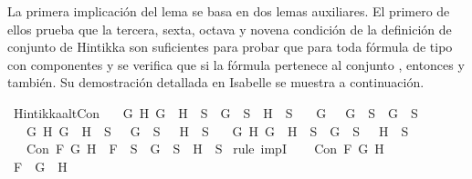 \begin{isabellebody}
\begin{isamarkuptext}
  La primera implicación del lema se basa en dos lemas auxiliares. El primero de ellos 
  prueba que la tercera, sexta, octava y novena condición de la definición de conjunto de 
  Hintikka son suficientes para probar que para toda fórmula de tipo \isa{{\isasymalpha}} con componentes 
   y  se verifica que si la fórmula pertenece al conjunto , entonces  y 
   también. Su demostración detallada en Isabelle se muestra a continuación.%
\end{isamarkuptext}\isamarkuptrue%
\isamarkupfalse%
\ Hintikka{\isacharunderscore}alt{}Con{\isacharcolon}\isanewline
\ \ \ {\isachardoublequoteopen}{\isacharparenleft}{\isasymforall}G\ H{\isachardot}\ G\ \isactrlbold {\isasymand}\ H\ {\isasymin}\ S\ {\isasymlongrightarrow}\ G\ {\isasymin}\ S\ {\isasymand}\ H\ {\isasymin}\ S{\isacharparenright}\isanewline
\ \ {\isasymand}\ {\isacharparenleft}{\isasymforall}G{\isachardot}\ \isactrlbold {\isasymnot}\ {\isacharparenleft}\isactrlbold {\isasymnot}\ G{\isacharparenright}\ {\isasymin}\ S\ {\isasymlongrightarrow}\ G\ {\isasymin}\ S{\isacharparenright}\isanewline
\ \ {\isasymand}\ {\isacharparenleft}{\isasymforall}G\ H{\isachardot}\ \isactrlbold {\isasymnot}{\isacharparenleft}G\ \isactrlbold {\isasymor}\ H{\isacharparenright}\ {\isasymin}\ S\ {\isasymlongrightarrow}\ \isactrlbold {\isasymnot}\ G\ {\isasymin}\ S\ {\isasymand}\ \isactrlbold {\isasymnot}\ H\ {\isasymin}\ S{\isacharparenright}\isanewline
\ \ {\isasymand}\ {\isacharparenleft}{\isasymforall}G\ H{\isachardot}\ \isactrlbold {\isasymnot}{\isacharparenleft}G\ \isactrlbold {\isasymrightarrow}\ H{\isacharparenright}\ {\isasymin}\ S\ {\isasymlongrightarrow}\ G\ {\isasymin}\ S\ {\isasymand}\ \isactrlbold {\isasymnot}\ H\ {\isasymin}\ S{\isacharparenright}{\isachardoublequoteclose}\isanewline
\ \ \ {\isachardoublequoteopen}Con\ F\ G\ H\ {\isasymlongrightarrow}\ F\ {\isasymin}\ S\ {\isasymlongrightarrow}\ G\ {\isasymin}\ S\ {\isasymand}\ H\ {\isasymin}\ S{\isachardoublequoteclose}\isanewline
%
\isadelimproof
%
\endisadelimproof
%
\isatagproof
{}\isamarkupfalse%
\ {\isacharparenleft}rule\ impI{\isacharparenright}\isanewline
\ \ \isamarkupfalse%
\ {\isachardoublequoteopen}Con\ F\ G\ H{\isachardoublequoteclose}\isanewline
\ \ \isamarkupfalse%
\ \isamarkupfalse%
\ {\isachardoublequoteopen}F\ {\isacharequal}\ G\ \isactrlbold {\isasymand}\ H\ {\isasymor}\ \isanewline

\end{isabellebody}
